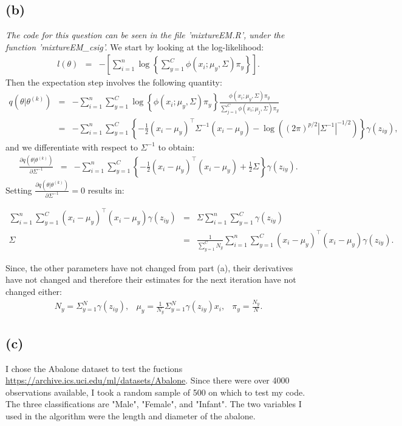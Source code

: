 \documentclass{article}\usepackage[]{graphicx}\usepackage[]{color}
\begin{document}
\subsection*{(b)}
\emph{The code for this question can be seen in the file 'mixtureEM.R', under the function 'mixtureEM\_csig'.}
We start by looking at the log-likelihood:
\begin{eqnarray*}
 l(\theta) &=& -\left[ \sum_{i=1}^n \log \left\{ \sum_{y=1}^C \phi(x_i;\mu_y,\Sigma)\pi_y \right\} \right].
\end{eqnarray*}
Then the expectation step involves the following quantity:
\begin{eqnarray*}
 q(\theta|\theta^{(k)}) &=& -\sum_{i=1}^n \sum_{y=1}^C \log \left\{ \phi(x_i;\mu_y,\Sigma)\pi_y \right\} \frac{\phi(x_i;\mu_y,\Sigma)\pi_y}{\sum_{j=1}^C \phi(x_i;\mu_j,\Sigma)\pi_y} \\
 &=& -\sum_{i=1}^n \sum_{y=1}^C  \left\{ -\frac{1}{2}(x_i-\mu_y)^\top\Sigma^{-1}(x_i-\mu_y) - \log((2\pi)^{p/2} |\Sigma^{-1}|^{-1/2} ) \right\} \gamma(z_{iy}),
\end{eqnarray*}
and we differentiate with respect to $\Sigma^{-1}$ to obtain:
\begin{eqnarray*}
 \frac{\partial q(\theta|\theta^{(k)})}{\partial\Sigma^{-1}} &=& -\sum_{i=1}^n \sum_{y=1}^C  \left\{ -\frac{1}{2}(x_i-\mu_y)^\top(x_i-\mu_y) + \frac{1}{2}\Sigma \right\} \gamma(z_{iy}).
\end{eqnarray*}
Setting $\frac{\partial q(\theta|\theta^{(k)})}{\partial\Sigma^{-1}}=0$ results in:

\begin{eqnarray*}
\sum_{i=1}^n \sum_{y=1}^C (x_i-\mu_y)^\top(x_i-\mu_y)\gamma(z_{iy}) &=& \Sigma \sum_{i=1}^n \sum_{y=1}^C \gamma(z_{iy}) \\
\Sigma &=& \frac{1}{\sum_{y=1}^{C}N_y} \sum_{i=1}^n \sum_{y=1}^C (x_i-\mu_y)^\top(x_i-\mu_y)\gamma(z_{iy}).
\end{eqnarray*}

Since, the other parameters have not changed from part (a), their derivatives have not changed and therefore their estimates for the next iteration have not changed either:
\begin{eqnarray*}
 N_y=\Sigma_{y=1}^{N}\gamma(z_{iy}), & \mu_y=\frac{1}{N_y}\Sigma_{y=1}^{N}\gamma(z_{iy})x_i, & \pi_y=\frac{N_y}{N}.
\end{eqnarray*}

\subsection*{(c)}
I chose the Abalone dataset to test the fuctions \url{https://archive.ics.uci.edu/ml/datasets/Abalone}.  Since there were over 4000 observations available, I took a random sample of 500 on which to test my code.  The three classifications are "Male", "Female", and "Infant".  The two variables I used in the algorithm were the length and diameter of the abalone.
\end{document}
